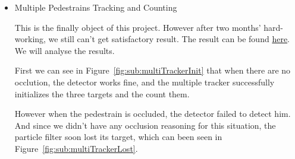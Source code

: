 \documentclass[a4paper]{article}
\begin{document}
\begin{enumerate}
\begin{itemize}
\item Multiple Pedestrains Tracking and Counting

This is the finally object of this project. However after two months' hard-working, we still can't get satisfactory result. The result can be found \href{https://zerowong.github.io/PedestrainCounting/results/multiTargetTracking01.avi}{here}. We will analyse the results.

First we can see in Figure~\ref{fig:sub:multiTrackerInit} that when there are no occlution, the detector works fine, and the multiple tracker successfully initializes the three targets and the count them.

However when the pedestrain is occluded, the detector failed to detect him. And since we didn't have any occlusion reasoning for this situation, the particle filter soon lost its target, which can been seen in Figure~\ref{fig:sub:multiTrackerLost}.


\end{itemize}
\end{enumerate}
\end{document}
